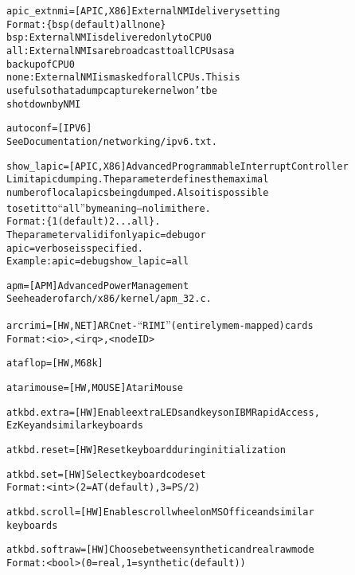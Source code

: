 \documentclass[a4paper,8pt,english]{sphinxmanual}
\begin{document}
\begin{alltt}
        apic\_extnmi=    {[}APIC,X86{]} External NMI delivery setting
                        Format: \{ bsp (default) \textbar{} all \textbar{} none \}
                        bsp:  External NMI is delivered only to CPU 0
                        all:  External NMIs are broadcast to all CPUs as a
                              backup of CPU 0
                        none: External NMI is masked for all CPUs. This is
                              useful so that a dump capture kernel won't be
                              shot down by NMI

        autoconf=       {[}IPV6{]}
                        See Documentation/networking/ipv6.txt.

        show\_lapic=     {[}APIC,X86{]} Advanced Programmable Interrupt Controller
                        Limit apic dumping. The parameter defines the maximal
                        number of local apics being dumped. Also it is possible
                        to set it to ``all'' by meaning -- no limit here.
                        Format: \{ 1 (default) \textbar{} 2 \textbar{} ... \textbar{} all \}.
                        The parameter valid if only apic=debug or
                        apic=verbose is specified.
                        Example: apic=debug show\_lapic=all

        apm=            {[}APM{]} Advanced Power Management
                        See header of arch/x86/kernel/apm\_32.c.

        arcrimi=        {[}HW,NET{]} ARCnet - ``RIM I'' (entirely mem-mapped) cards
                        Format: \textless{}io\textgreater{},\textless{}irq\textgreater{},\textless{}nodeID\textgreater{}

        ataflop=        {[}HW,M68k{]}

        atarimouse=     {[}HW,MOUSE{]} Atari Mouse

        atkbd.extra=    {[}HW{]} Enable extra LEDs and keys on IBM RapidAccess,
                        EzKey and similar keyboards

        atkbd.reset=    {[}HW{]} Reset keyboard during initialization

        atkbd.set=      {[}HW{]} Select keyboard code set
                        Format: \textless{}int\textgreater{} (2 = AT (default), 3 = PS/2)

        atkbd.scroll=   {[}HW{]} Enable scroll wheel on MS Office and similar
                        keyboards

        atkbd.softraw=  {[}HW{]} Choose between synthetic and real raw mode
                        Format: \textless{}bool\textgreater{} (0 = real, 1 = synthetic (default))


\end{alltt}
\end{document}
